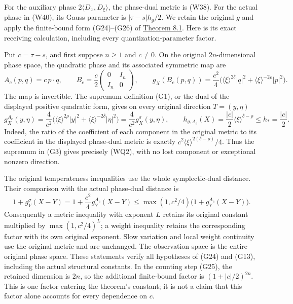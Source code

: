 \documentclass[
  11pt,
]{article}
\begin{document}
For the auxiliary phase \(2\langle D_x,D_\xi\rangle\), the phase-dual
metric is (W38). For the actual phase in (W40), its Gauss parameter is
\(|\tau-s|h_g/2\). We retain the original \(g\) and apply the
finite-bound form (G24)--(G26) of
\href{gauss-transform-estimates.pdf\#section*.46}{Theorem
8.1}. Here is its exact receiving calculation, including every
quantization-parameter factor.

Put \(c=\tau-s\), and first suppose \(n\geq1\) and \(c\ne0\). On the
original \(2n\)-dimensional phase space, the quadratic phase and its
associated symmetric map are \[
 A_c(p,q)=c\,p\cdot q,\qquad
 B_c=\frac c2
 \begin{pmatrix}0&I_n\\ I_n&0\end{pmatrix},\qquad
 g_X(B_c(p,q))=\frac{c^2}{4}
 \big(\langle\xi\rangle^{2\delta}|q|^2+
      \langle\xi\rangle^{-2\rho}|p|^2\big).
 \tag{WQ1}
\] The map is invertible. The supremum definition (G1), or the dual of
the displayed positive quadratic form, gives on every original direction
\(T=(y,\eta)\) \[
 g_X^{A_c}(y,\eta)=\frac4{c^2}
 \big(\langle\xi\rangle^{2\rho}|y|^2+
      \langle\xi\rangle^{-2\delta}|\eta|^2\big)
 =\frac4{c^2}g_X^\sigma(y,\eta),\qquad
 h_{g,A_c}(X)=\frac{|c|}{2}\langle\xi\rangle^{\delta-\rho}
 \leq h_*=\frac{|c|}{2}.
 \tag{WQ2}
\] Indeed, the ratio of the coefficient of each component in the
original metric to its coefficient in the displayed phase-dual metric is
exactly \(c^2\langle\xi\rangle^{2(\delta-\rho)}/4\). Thus the supremum
in (G3) gives precisely (WQ2), with no lost component or exceptional
nonzero direction.

The original temperateness inequalities use the whole symplectic-dual
distance. Their comparison with the actual phase-dual distance is \[
 1+g_Y^\sigma(X-Y)
 =1+\frac{c^2}{4}g_Y^{A_c}(X-Y)
 \leq \max(1,c^2/4)\big(1+g_Y^{A_c}(X-Y)\big).
 \tag{WQ3}
\] Consequently a metric inequality with exponent \(L\) retains its
original constant multiplied by \(\max(1,c^2/4)^L\); a weight inequality
retains the corresponding factor with its own original exponent. Slow
variation and local weight continuity use the original metric and are
unchanged. The observation space is the entire original phase space.
These statements verify all hypotheses of (G24) and (G13), including the
actual structural constants. In the counting step (G25), the retained
dimension is \(2n\), so the additional finite-bound factor is
\((1+|c|/2)^{2n}\). This is one factor entering the theorem's constant;
it is not a claim that this factor alone accounts for every dependence
on \(c\).
\end{document}
